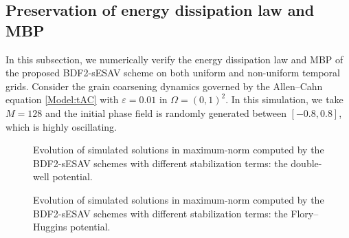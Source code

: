 \documentclass{m2an}
\begin{document}
\subsection{Preservation of energy dissipation law and MBP}\label{sec:ex2}
In this subsection, we numerically verify the energy dissipation law and MBP of the proposed BDF2-sESAV scheme on both uniform and non-uniform temporal grids. Consider the grain coarsening dynamics governed by the Allen--Cahn equation \eqref{Model:tAC} with $ \varepsilon = 0.01 $ in $ \Omega=(0,1)^2 $. In this simulation, we take $ M=128 $ and the initial phase field is randomly generated between $ [-0.8,0.8] $, which is highly oscillating. 

\begin{figure}[!htbp]
	\vspace{-12pt}
	\centering
	\setlength{\abovecaptionskip}{0.0cm} 
	\setlength{\belowcaptionskip}{0.0cm}
	\caption{Evolution of simulated solutions in maximum-norm computed by the BDF2-sESAV schemes with different stabilization terms: the double-well potential.}	
	\label{figEx2_1}
\end{figure}
%
\begin{figure}[!ht]
	\vspace{-12pt}
	\centering
	
	\setlength{\abovecaptionskip}{0.0cm} 
	\setlength{\belowcaptionskip}{0.0cm}
	\caption{Evolution of simulated solutions in maximum-norm  computed by the BDF2-sESAV schemes with different stabilization terms: the Flory--Huggins potential.}	
	\label{figEx2_2}
	\vspace{-10pt}	
\end{figure}
\end{document}
